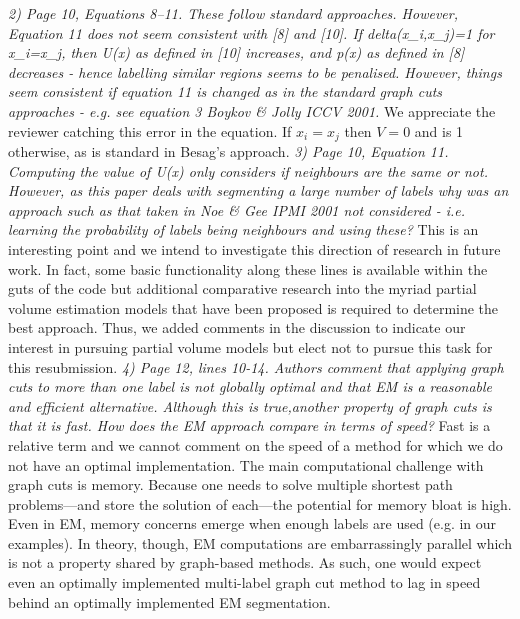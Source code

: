 \documentclass[11pt]{article}
\begin{document}
\noindent
{\em 2) Page 10, Equations 8--11. These follow standard
  approaches. However, Equation 11 does not seem consistent with [8]
  and [10]. If delta(x\_i,x\_j)=1 for x\_i=x\_j, then U(x) as defined in
  [10] increases, and p(x) as defined in [8] decreases - hence
  labelling similar regions seems to be penalised. However, things
  seem consistent if equation 11 is changed as in the standard graph
  cuts approaches - e.g. see equation 3 Boykov \& Jolly ICCV 2001.}
\newline
\newline
We appreciate the reviewer catching this error in the equation.  If $x_i = x_j$ then $V=0$ and is
1 otherwise, as is standard in Besag's approach. 
\newline
\newline
{\em 3) Page 10, Equation 11. Computing the value of U(x) only
  considers if neighbours are the same or not. However, as this paper
  deals with segmenting a large number of labels why was an approach
  such as that taken in Noe \& Gee IPMI 2001 not considered -
  i.e. learning the probability of labels being neighbours and using
  these?}
\newline
\newline
This is an interesting point and we intend to investigate this
direction of research in future work.  In fact, some basic
functionality along these lines is available within the guts of the
code but additional comparative research into the myriad partial volume
estimation models that have been proposed is required to determine the
best approach.  Thus, we added comments in the discussion to indicate
our interest in pursuing partial volume models but elect not to pursue
this task for this resubmission. 
\newline
\newline
{\em 4) Page 12, lines 10-14. Authors comment that applying graph cuts
  to more than one label is not globally optimal and that EM is a
  reasonable and efficient alternative. Although this is true,another
  property of graph cuts is that it is fast. How does the EM approach
  compare in terms of speed?}
\newline
\newline
Fast is a relative term and we cannot comment on the speed of a method
for which we do not have an optimal implementation.  
The main computational challenge with graph cuts is memory.  Because one needs to
solve multiple shortest path problems---and store the solution of
each---the potential for memory bloat is high.  Even in EM, memory
concerns emerge when enough labels are used (e.g. in our examples).
In theory, though, EM computations are embarrassingly parallel which is
not a property shared by graph-based methods.  As such, one would
expect even an optimally implemented multi-label graph cut method to
lag in speed behind an optimally implemented EM segmentation.  
\end{document}
